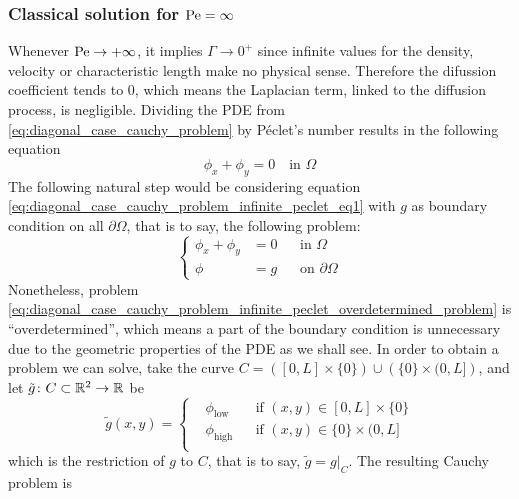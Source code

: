 \subsubsection{Classical solution for \texorpdfstring{$\mathrm{Pe} =
\infty$}{infinite Péclet's number}}

Whenever $\mathrm{Pe} \to +\infty$, it implies $\Gamma \to 0^+$ since infinite
values for the density, velocity or characteristic length make no physical
sense. Therefore the difussion coefficient tends to $0$, which means the
Laplacian term, linked to the diffusion process, is negligible. Dividing the PDE
from \eqref{eq:diagonal_case_cauchy_problem} by Péclet's number results in the
following equation
\begin{equation} \label{eq:diagonal_case_cauchy_problem_infinite_peclet_eq1}
	\phi_x + \phi_y = 0 \quad \text{in } \Omega
\end{equation}
The following natural step would be considering equation
\eqref{eq:diagonal_case_cauchy_problem_infinite_peclet_eq1} with $g$ as boundary
condition on all $\partial \Omega$, that is to say, the following problem:
\begin{equation} \label{eq:diagonal_case_cauchy_problem_infinite_peclet_overdetermined_problem}
	\left\{
	\begin{aligned}
		\phi_x + \phi_y &= 0 &
		&\text{in } \Omega \\
		\phi &= g &
		&\text{on } \partial \Omega
	\end{aligned}
	\right.
\end{equation}
Nonetheless, problem
\eqref{eq:diagonal_case_cauchy_problem_infinite_peclet_overdetermined_problem}
is ``overdetermined'', which means a part of the boundary condition is
unnecessary due to the geometric properties of the PDE as we shall see. In order
to obtain a problem we can solve, take the curve $C = \left( [0,L] \times \{ 0
\} \right) \cup \left( \{ 0 \} \times (0,L] \right)$, and let $\tilde{g} \colon
C \subset \mathbb{R}^2 \rightarrow \mathbb{R}$ be
\begin{equation}
	\tilde{g}(x,y) = 
	\left\{
	\begin{aligned}
		&\phi_\text{low} 	& &\text{if } (x,y) \in [0,L] \times \{ 0 \} \\
		&\phi_\text{high} 	& &\text{if } (x,y) \in \{ 0 \} \times (0,L] \\
	\end{aligned}
	\right.
\end{equation}
which is the restriction of $g$ to $C$, that is to say, $\tilde{g} = g
\rvert_C$. The resulting Cauchy problem is
